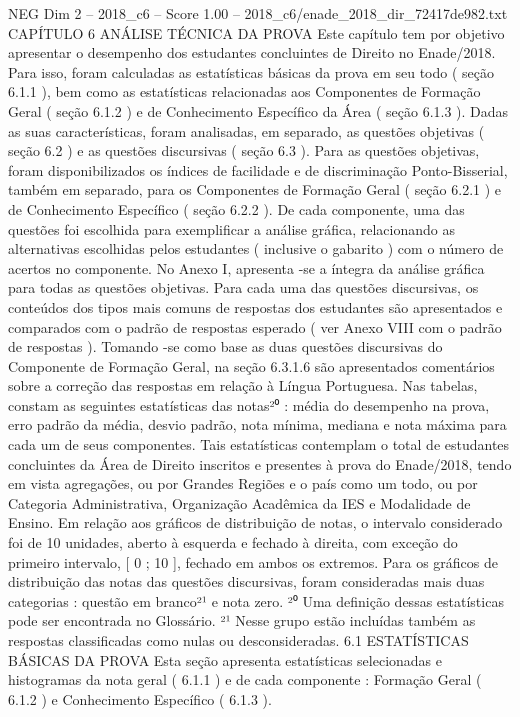 \begin{textsample}{NEG Dim 2 – 2018\_c6 – Score 1.00 – 2018\_c6/enade\_2018\_dir\_72417de982.txt}  \label{ex:f2_neg_236}
CAPÍTULO 6 ANÁLISE TÉCNICA DA PROVA Este capítulo tem por objetivo apresentar o desempenho dos estudantes concluintes de Direito no Enade/2018.
Para isso, foram calculadas as estatísticas básicas da prova em seu todo ( seção 6.1.1 ), bem como as estatísticas relacionadas aos Componentes de Formação Geral ( seção 6.1.2 ) e de Conhecimento Específico da Área ( seção 6.1.3 ).
Dadas as suas características, foram analisadas, em separado, as questões objetivas ( seção 6.2 ) e as questões discursivas ( seção 6.3 ).
Para as questões objetivas, foram disponibilizados os índices de facilidade e de discriminação Ponto-Bisserial, também em separado, para os Componentes de Formação Geral ( seção 6.2.1 ) e de Conhecimento Específico ( seção 6.2.2 ).
De cada componente, uma das questões foi escolhida para exemplificar a análise gráfica, relacionando as alternativas escolhidas pelos estudantes ( inclusive o gabarito ) com o número de acertos no componente.
No Anexo I, apresenta -se a íntegra da análise gráfica para todas as questões objetivas.
Para cada uma das questões discursivas, os conteúdos dos tipos mais comuns de respostas dos estudantes são apresentados e comparados com o padrão de respostas esperado ( ver Anexo VIII com o padrão de respostas ).
Tomando -se como base as duas questões discursivas do Componente de Formação Geral, na seção 6.3.1.6 são apresentados comentários sobre a correção das respostas em relação à Língua Portuguesa.
Nas tabelas, constam as seguintes estatísticas das notas²⁰ : média do desempenho na prova, erro padrão da média, desvio padrão, nota mínima, mediana e nota máxima para cada um de seus componentes.
Tais estatísticas contemplam o total de estudantes concluintes da Área de Direito inscritos e presentes à prova do Enade/2018, tendo em vista agregações, ou por Grandes Regiões e o país como um todo, ou por Categoria Administrativa, Organização Acadêmica da IES e Modalidade de Ensino.
Em relação aos gráficos de distribuição de notas, o intervalo considerado foi de 10 unidades, aberto à esquerda e fechado à direita, com exceção do primeiro intervalo, [ 0 ; 10 ], fechado em ambos os extremos.
Para os gráficos de distribuição das notas das questões discursivas, foram consideradas mais duas categorias : questão em branco²¹ e nota zero. ²⁰ Uma definição dessas estatísticas pode ser encontrada no Glossário. ²¹ Nesse grupo estão incluídas também as respostas classificadas como nulas ou desconsideradas. 6.1 ESTATÍSTICAS BÁSICAS DA PROVA Esta seção apresenta estatísticas selecionadas e histogramas da nota geral ( 6.1.1 ) e de cada componente : Formação Geral ( 6.1.2 ) e Conhecimento Específico ( 6.1.3 ).

\end{textsample}

